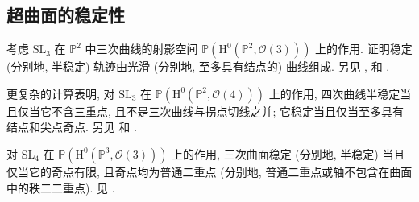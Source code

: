 \subsection{超曲面的稳定性}\label{src:8.5.2-subsection}
\begin{exercise}[三次曲线]\label{src:8.5.3}
考虑 $\mathrm{SL}_3$ 在 $\mathbb P^2$ 中三次曲线的射影空间 $\mathbb P(\mathrm H^0(\mathbb P^2,\mathcal O(3)))$ 上的作用. 证明稳定 (分别地, 半稳定) 轨迹由光滑 (分别地, 至多具有结点的) 曲线组成. 另见 \cite[\S1.11]{Mum77}, \cite[\S4.4]{New78} 和 \cite[第 202--206 页]{HM98}.
\end{exercise}
\begin{exercise}[四次曲线, 困难]\label{src:8.5.4}
更复杂的计算表明, 对 $\mathrm{SL}_3$ 在 $\mathbb P(\mathrm H^0(\mathbb P^2,\mathcal O(4)))$ 上的作用, 四次曲线半稳定当且仅当它不含三重点, 且不是三次曲线与拐点切线之并; 它稳定当且仅当至多具有结点和尖点奇点. 另见 \cite[\S1.12--13]{Mum77} 和 \cite[\S4A]{HM98}.
\end{exercise}
\begin{remark}[三次曲面]\label{src:8.5.5}
对 $\mathrm{SL}_4$ 在 $\mathbb P(\mathrm H^0(\mathbb P^3,\mathcal O(3)))$ 上的作用, 三次曲面稳定 (分别地, 半稳定) 当且仅当它的奇点有限, 且奇点均为普通二重点 (分别地, 普通二重点或轴不包含在曲面中的秩二二重点). 见 \cite[定理 7.14]{Muk03}.
\end{remark}

